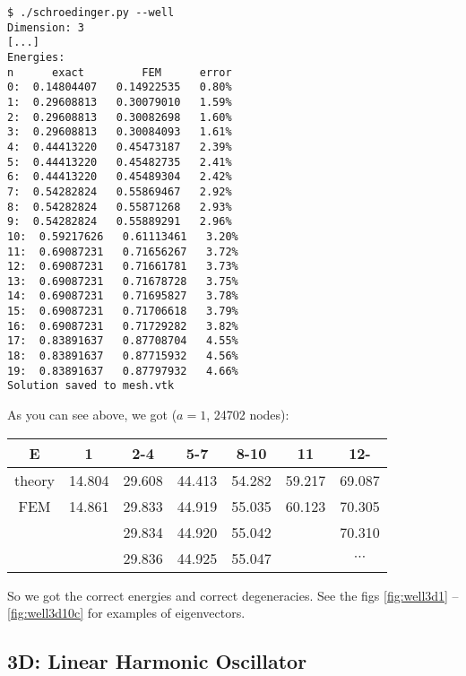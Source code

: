 \begin{lstlisting}
$ ./schroedinger.py --well
Dimension: 3
[...]
Energies:
n      exact         FEM      error
0:  0.14804407   0.14922535   0.80%
1:  0.29608813   0.30079010   1.59%
2:  0.29608813   0.30082698   1.60%
3:  0.29608813   0.30084093   1.61%
4:  0.44413220   0.45473187   2.39%
5:  0.44413220   0.45482735   2.41%
6:  0.44413220   0.45489304   2.42%
7:  0.54282824   0.55869467   2.92%
8:  0.54282824   0.55871268   2.93%
9:  0.54282824   0.55889291   2.96%
10:  0.59217626   0.61113461   3.20%
11:  0.69087231   0.71656267   3.72%
12:  0.69087231   0.71661781   3.73%
13:  0.69087231   0.71678728   3.75%
14:  0.69087231   0.71695827   3.78%
15:  0.69087231   0.71706618   3.79%
16:  0.69087231   0.71729282   3.82%
17:  0.83891637   0.87708704   4.55%
18:  0.83891637   0.87715932   4.56%
19:  0.83891637   0.87797932   4.66%
Solution saved to mesh.vtk
\end{lstlisting}

As you can see above, we got ($a=1$, 24702 nodes):

\begin{tabular}{ c | c c c c c c }
E      & 1 & 2-4 & 5-7 & 8-10 & 11 & 12- \\
\hline
theory & 14.804 & 29.608 & 44.413 & 54.282 & 59.217 & 69.087 \\
FEM    & 14.861 & 29.833 & 44.919 & 55.035 & 60.123 & 70.305 \\
       &        & 29.834 & 44.920 & 55.042 &        & 70.310 \\
       &        & 29.836 & 44.925 & 55.047 &        & $\cdots$ \\
\end{tabular}

So we got the correct energies and correct degeneracies. See the figs
\ref{fig:well3d1} -- \ref{fig:well3d10c} for examples of eigenvectors.




\subsection{3D: Linear Harmonic Oscillator}

